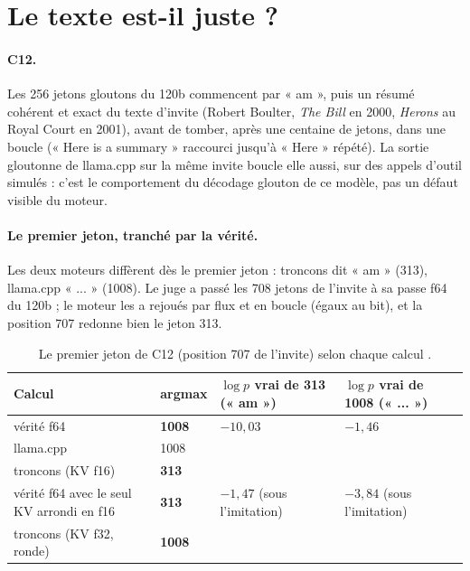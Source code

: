 \section{Le texte est-il juste ?}\label{t2e-sec:texte}

\paragraph{C12.} Les 256 jetons gloutons du 120b commencent par « am », puis un résumé cohérent et exact du texte d'invite (Robert Boulter, \emph{The Bill} en 2000, \emph{Herons} au Royal Court en 2001), avant de tomber, après une centaine de jetons, dans une boucle (« Here is a summary » raccourci jusqu'à « Here » répété). La sortie gloutonne de llama.cpp sur la même invite boucle elle aussi, sur des appels d'outil simulés : c'est le comportement du décodage glouton de ce modèle, pas un défaut visible du moteur.

\paragraph{Le premier jeton, tranché par la vérité.} Les deux moteurs diffèrent dès le premier jeton : troncons dit « am » (313), llama.cpp « ... » (1008). Le juge a passé les 708 jetons de l'invite à sa passe f64 du 120b ; le moteur les a rejoués par flux et en boucle (égaux au bit), et la position 707 redonne bien le jeton 313.

\begin{table}[ht]
\centering\footnotesize
\caption[Le premier jeton de C12]{Le premier jeton de C12 (position 707 de l'invite) selon chaque calcul \mes.}
\label{t2e-tab:premier}
\begin{tabular}{@{}llll@{}}
\toprule
Calcul & argmax & $\log p$ vrai de 313 (« am ») & $\log p$ vrai de 1008 (« ... ») \\
\midrule
vérité f64 & \textbf{1008} & $-10{,}03$ & $-1{,}46$ \\
llama.cpp & 1008 & & \\
troncons (KV f16) & \textbf{313} & & \\
vérité f64 avec le seul KV arrondi en f16 & \textbf{313} & $-1{,}47$ (sous l'imitation) & $-3{,}84$ (sous l'imitation) \\
troncons (KV f32, ronde) & \textbf{1008} & & \\
\bottomrule
\end{tabular}
\end{table}

